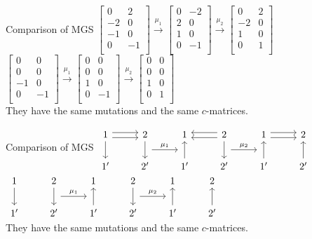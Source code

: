 \documentclass{beamer}
\newcommand{\rightdoublearrow}{\arrow[r, shift right=0.6ex]\arrow[r, shift left=0.6ex]}
\newcommand{\leftdoublearrow}{\arrow[l, shift right=0.6ex]\arrow[l, shift left=0.6ex]}
\begin{document}
\begin{frame}{Comparison of MGS}
$\begin{bmatrix} 0 & 2 \\ -2 & 0 \\ -1 & 0 \\ 0 & -1\\ \end{bmatrix}
\overset{\mu_1}{\to}\begin{bmatrix} 0 & -2 \\ 2 & 0 \\ 1 & 0 \\ 0 & -1\\ \end{bmatrix}
\overset{\mu_2}{\to}\begin{bmatrix} 0 & 2 \\ -2 & 0 \\ 1 & 0 \\ 0 & 1\\ \end{bmatrix}$\\\pause
$\begin{bmatrix} 0 & 0 \\ 0 & 0 \\ -1 & 0 \\ 0 & -1\\ \end{bmatrix}
\overset{\mu_1}{\to}\begin{bmatrix} 0 & 0 \\ 0 & 0 \\ 1 & 0 \\ 0 & -1\\ \end{bmatrix}
\overset{\mu_2}{\to}\begin{bmatrix} 0 & 0 \\ 0 & 0 \\ 1 & 0 \\ 0 & 1\\ \end{bmatrix}$\\\pause
\vskip 0.2in
They have the same mutations and the same $c$-matrices.\\
\end{frame}

\begin{frame}[fragile]{Comparison of MGS}
$\begin{tikzcd}
1 \rightdoublearrow\arrow[d] & 2\arrow [d]\arrow[r,"\mu_1", shift right=3.5ex]  & 1&2\leftdoublearrow\arrow[d]\arrow[r,"\mu_2", shift right=3.5ex]&1\rightdoublearrow & 2\\
1' & 2'&1'\arrow[u]& 2'&1'\arrow[u] & 2'\arrow[u]\end{tikzcd}$\\\pause
$\begin{tikzcd} 1\arrow[d]&2\arrow[d]\arrow[r,"\mu_1", shift right=3.5ex]&1&2\arrow[d]\arrow[r,"\mu_2", shift right=3.5ex]&1&2\\
 1'&2'&1'\arrow[u]&2'&1'\arrow[u]&2'\arrow[u]
\end{tikzcd}$\\\pause
\vskip 0.2in
They have the same mutations and the same $c$-matrices.\\
\end{frame}
\end{document}
